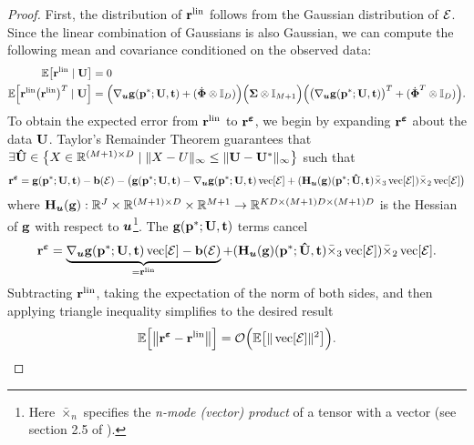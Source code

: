 \begin{proof}
	First, the distribution of $\mathbf{r}^{\mathrm{lin}}$ follows from the Gaussian distribution of $\mathbf{\mathcal{E}}$. Since the linear combination of Gaussians is also Gaussian, we can compute the following mean and covariance conditioned on the observed data:
	\begin{align*}
		\mathbb{E}\bigl[\mathbf{r}^{\mathrm{lin}} \mid \mathbf{U}\bigr] &= 0 \\ 
		\mathbb{E}\Bigl[\mathbf{r}^{\mathrm{lin}} \bigl(\mathbf{r}^{\mathrm{lin}}\bigr)^T \mid \mathbf{U}\Bigr] &= \Bigl(\nabla_{\boldsymbol{u}} \mathbf{g}(\mathbf{p}^*;\mathbf{U},\mathbf{t}) + (\dot{\boldsymbol{\Phi}} \otimes \mathbb{I}_D) \Bigr) \Bigl(  \mathbf{\Sigma} \otimes \mathbb{I}_{M+1} \Bigr) \Bigl(\bigl(\nabla_{\boldsymbol{u}} \mathbf{g}(\mathbf{p}^*;\mathbf{U},\mathbf{t})\bigr)^T + (\dot{\boldsymbol{\Phi}}^T \otimes \mathbb{I}_D)\Bigr).
	\end{align*}
	To obtain the expected error from $\mathbf{r}^{\mathrm{lin}}$ to $\mathbf{r}^{\boldsymbol{\varepsilon}}$, we begin by expanding $\mathbf{r}^{\boldsymbol{\varepsilon}}$ about the data $\mathbf{U}$. Taylor's Remainder Theorem guarantees that $\exists \mathbf{\hat{U}} \in \bigl\{X \in \mathbb{R}^{(M+1)\times D} \mid \|X - U\|_\infty \leq \|\mathbf{U}-\mathbf{U}^*\|_\infty\bigr\}$ such that
	\[\mathbf{r}^{\boldsymbol{\varepsilon}} = \mathbf{g}(\mathbf{p}^*; \mathbf{U}, \mathbf{t}) - \mathbf{b}(\mathbf{\mathcal{E}})- \bigl(\mathbf{g}(\mathbf{p}^*;\mathbf{U},\mathbf{t}) - \nabla_{\boldsymbol{u}} \mathbf{g}(\mathbf{p}^*;\mathbf{U},\mathbf{t})\operatorname{vec}[\mathbf{\mathcal{E}}] + (\mathbf{H}_{\boldsymbol{u}}(\mathbf{g})(\mathbf{p}^*; \mathbf{\hat{U}}, \mathbf{t}) \bar{\times}_3 \operatorname{vec}[\mathbf{\mathcal{E}}]) \bar{\times}_2 \operatorname{vec}[\mathbf{\mathcal{E}}] \bigr) \]
	where $\mathbf{H}_{\boldsymbol{u}}(\mathbf{g}): \mathbb{R}^J \times \mathbb{R}^{(M+1) \times D} \times \mathbb{R}^{M+1} \rightarrow \mathbb{R}^{KD\times (M+1)D \times (M+1)D}$ is the Hessian of $\mathbf{g}$ with respect to $\boldsymbol{u}$\footnote{Here $\bar{\times}_n$ specifies the \emph{n-mode (vector) product} of a tensor with a vector (see section 2.5 of \citep{KoldaBader2009SIAMRev}).}. The $\mathbf{g}(\mathbf{p}^*; \mathbf{U}, \mathbf{t})$ terms cancel
	\[\mathbf{r}^{\boldsymbol{\varepsilon}} = \underbrace{\nabla_{\boldsymbol{u}} \mathbf{g}(\mathbf{p}^*;\mathbf{U},\mathbf{t})\operatorname{vec}[\mathbf{\mathcal{E}}] - \mathbf{b}(\mathbf{\mathcal{E}})}_{=\mathbf{r}^{\mathrm{lin}}} + (\mathbf{H}_{\boldsymbol{u}}(\mathbf{g})(\mathbf{p}^*; \mathbf{\hat{U}}, \mathbf{t}) \bar{\times}_3 \operatorname{vec}[\mathbf{\mathcal{E}}]) \bar{\times}_2 \operatorname{vec}[\mathbf{\mathcal{E}}].\]
	Subtracting $\mathbf{r}^{\mathrm{lin}}$, taking the expectation of the norm of both sides, and then applying triangle inequality simplifies to the desired result
	\[\mathbb{E}\Bigl[\bigl\|\mathbf{r}^{\boldsymbol{\varepsilon}} - \mathbf{r}^{\mathrm{lin}}\bigr\|\Bigr] = \mathcal{O}\Bigl(\mathbb{E}\bigl[\|\operatorname{vec}[\mathbf{\mathcal{E}}]\|^2\bigr]\Bigr).\]
\end{proof}


